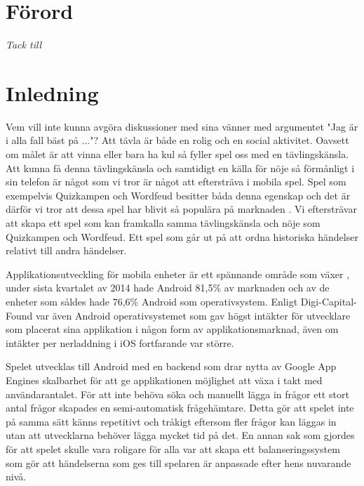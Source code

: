 \documentclass[a4paper, 11pt]{article}
\begin{document}
\newpage
\section{Förord}
\textit{Tack till}
\newpage
\tableofcontents
\pagebreak

\section{Inledning}
Vem vill inte kunna avgöra diskussioner med sina vänner med argumentet "Jag är i alla fall bäst på ..."? 
Att tävla är både en rolig och en social aktivitet. Oavsett om målet är att vinna eller bara ha kul så fyller spel oss med en tävlingskänsla. Att kunna få denna tävlingskänsla och samtidigt en källa för nöje så förmånligt i sin telefon är något som vi tror är något att eftersträva i mobila spel. Spel som exempelvis Quizkampen \cite{quiz} och Wordfeud \cite{wordfeud} besitter båda denna egenskap och det är därför vi tror att dessa spel har blivit så populära på marknaden \cite{appsalesrating}. Vi eftersträvar att skapa ett spel som kan framkalla samma tävlingskänsla och nöje som Quizkampen och Wordfeud. Ett spel som går ut på att ordna historiska händelser relativt till andra händelser. 

Applikationsutveckling för mobila enheter är ett spännande område som växer \cite{IDC}, under sista kvartalet av 2014 hade Android 81,5\% av marknaden och av de enheter som såldes hade 76,6\% Android som operativsystem. Enligt Digi-Capital-Found \cite{revenue} var även Android operativsystemet som gav högst intäkter för utvecklare som placerat sina applikation i någon form av applikationsmarknad, även om intäkter per nerladdning i iOS fortfarande var större. 

Spelet utvecklas till Android med en backend som drar nytta av Google App Engines skalbarhet för att ge applikationen möjlighet att växa i takt med användarantalet. För att inte behöva söka och manuellt lägga in frågor ett stort antal frågor skapades en semi-automatisk frågehämtare. Detta gör att spelet inte på samma sätt känns repetitivt och tråkigt eftersom fler frågor kan läggas in utan att utvecklarna behöver lägga mycket tid på det. En annan sak som gjordes för att spelet skulle vara roligare för alla var att skapa ett balanseringssystem som gör att händelserna som ges till spelaren är anpassade efter hens nuvarande nivå.
\end{document}
